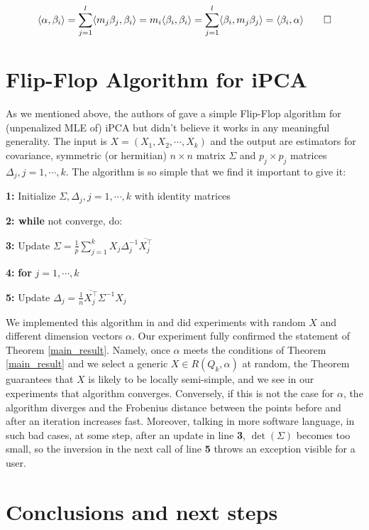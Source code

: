 \documentclass[reqno]{amsart}
\theoremstyle{plain}
\theoremstyle{definition}
\theoremstyle{remark}
\begin{document}
$$
\langle \alpha, \beta_i\rangle=\sum_{j=1}^l \langle m_j\beta_j, \beta_i\rangle=m_i\langle \beta_i, \beta_i\rangle=\sum_{j=1}^l \langle \beta_i,m_j\beta_j\rangle= \langle  \beta_i,\alpha\rangle \qed
$$

\section{Flip-Flop Algorithm for iPCA}\label{FFS}

As we mentioned above, the authors of \cite{ta} gave a simple Flip-Flop algorithm for (unpenalized MLE of) iPCA but didn't believe it works in any meaningful generality. The input is $X=(X_1,X_2,\cdots,X_k)$ and the output are estimators for covariance, symmetric (or hermitian) $n\times n$ matrix $\Sigma$ and $p_j\times p_j$ matrices $\Delta_j, j=1,\cdots,k$. The algorithm is so simple that we find it important to give it:

{\bf 1:} Initialize $\Sigma,\Delta_j,j=1,\cdots,k$ with identity matrices

{\bf 2: while} not converge, do:

{\bf 3:} \hspace{0.2cm} Update $\Sigma = \frac{1}{p}\sum_{j=1}^k X_j \Delta_j^{-1}\overline{X_j^{\top}}$

{\bf 4:} \hspace{0.2cm} {\bf for} $j=1,\cdots,k$

{\bf 5:} \hspace{0.4cm} Update $\Delta_j=\frac{1}{n} \overline{X_j^{\top}} \Sigma^{-1} X_j$

We  implemented this algorithm in \cite{ff} and did experiments with random $X$ and different dimension vectors $\alpha$. Our experiment fully confirmed the statement of Theorem \ref{main_result}. Namely, once $\alpha$ meets the conditions of Theorem \ref{main_result} and we select a generic $X\in R(Q_k,\alpha)$ at random, the Theorem guarantees that $X$ is likely to be locally semi-simple, and we see in our experiments that  algorithm converges. Conversely, if this is not the case for $\alpha$, the algorithm diverges and the Frobenius distance between the points before and after an iteration increases fast. Moreover, talking in more software language, in such bad cases,  at some step,  after an update in line {\bf 3}, $\det(\Sigma)$ becomes too small, so the inversion in the next call of line {\bf 5} throws an exception visible for a user.

\section{Conclusions and next steps}
\end{document}
